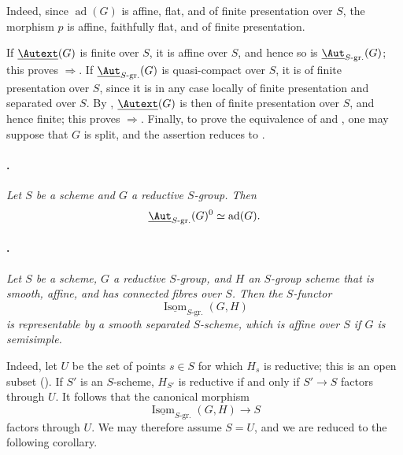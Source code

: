 Indeed, since \(\operatorname{ad}(G)\) is affine, flat, and of finite
presentation over \(S\), the morphism \(p\)
is affine, faithfully flat, and of finite presentation.

If \(\underline{\Autext}(G)\) is finite over \(S\), it is affine over
\(S\), and hence so is
\(\underline{\Aut}_{S\text{-}\mathrm{gr.}}(G)\); this proves
\textup{}\(\Rightarrow\)\textup{}. If
\(\underline{\Aut}_{S\text{-}\mathrm{gr.}}(G)\) is quasi-compact over
\(S\), it is of finite presentation over \(S\), since it is in any
case locally of finite presentation and separated over \(S\). By
, \(\underline{\Autext}(G)\) is then of finite presentation
over \(S\), and hence finite; this proves
\textup{}\(\Rightarrow\)\textup{}. Finally, to prove the
equivalence of \textup{} and \textup{}, one may suppose that
\(G\) is split, and the assertion reduces to .

\paragraph{.}
\emph{Let \(S\) be a scheme and \(G\) a reductive \(S\)-group. Then}
\[
  \underline{\Aut}_{S\text{-}\mathrm{gr.}}(G)^0
  \simeq\operatorname{ad}(G).
\]

\paragraph{.}
\emph{Let \(S\) be a scheme, \(G\) a reductive \(S\)-group, and
\(H\) an \(S\)-group scheme that is smooth, affine, and has connected
fibres over \(S\). Then the \(S\)-functor}
\[
  \underline{\operatorname{Isom}}_{S\text{-}\mathrm{gr.}}(G,H)
\]
\emph{is representable by a smooth separated \(S\)-scheme, which is
affine over \(S\) if \(G\) is semisimple.}

Indeed, let \(U\) be the set of points \(s\in S\) for which \(H_s\)
is reductive; this is an open subset \textup{()}. If
\(S'\) is an \(S\)-scheme, \(H_{S'}\) is reductive if and only if
\(S'\to S\) factors through \(U\). It follows that the canonical
morphism
\[
  \underline{\operatorname{Isom}}_{S\text{-}\mathrm{gr.}}(G,H)
  \longrightarrow S
\]
factors through \(U\). We may therefore assume \(S=U\), and we are
reduced to the following corollary.
